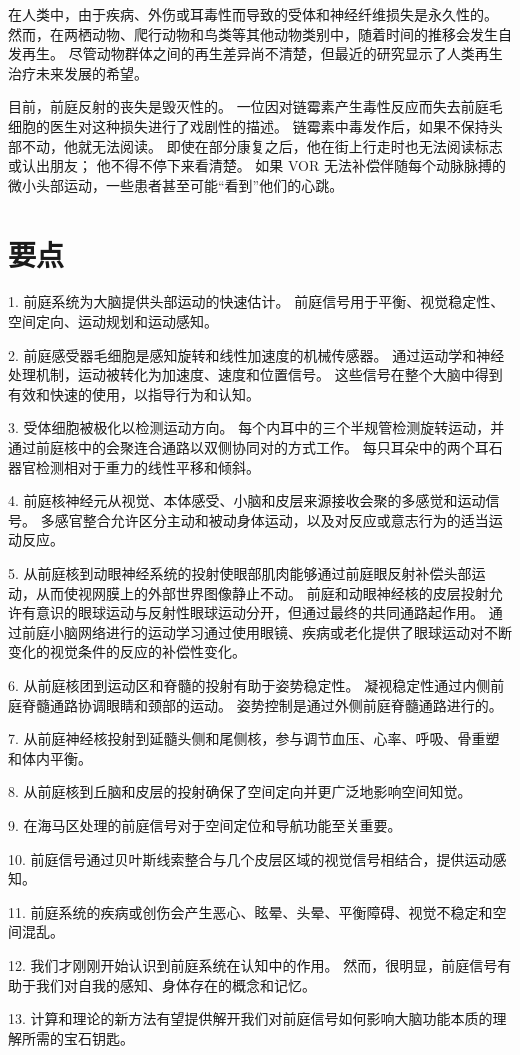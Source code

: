 在人类中，由于疾病、外伤或耳毒性而导致的受体和神经纤维损失是永久性的。
然而，在两栖动物、爬行动物和鸟类等其他动物类别中，随着时间的推移会发生自发再生。
尽管动物群体之间的再生差异尚不清楚，但最近的研究显示了人类再生治疗未来发展的希望。


目前，前庭反射的丧失是毁灭性的。
一位因对链霉素产生毒性反应而失去前庭毛细胞的医生对这种损失进行了戏剧性的描述。
链霉素中毒发作后，如果不保持头部不动，他就无法阅读。
即使在部分康复之后，他在街上行走时也无法阅读标志或认出朋友；
他不得不停下来看清楚。
如果 VOR 无法补偿伴随每个动脉脉搏的微小头部运动，一些患者甚至可能“看到”他们的心跳。



\section{要点}

1. 前庭系统为大脑提供头部运动的快速估计。
前庭信号用于平衡、视觉稳定性、空间定向、运动规划和运动感知。


2. 前庭感受器毛细胞是感知旋转和线性加速度的机械传感器。
通过运动学和神经处理机制，运动被转化为加速度、速度和位置信号。
这些信号在整个大脑中得到有效和快速的使用，以指导行为和认知。


3. 受体细胞被极化以检测运动方向。
每个内耳中的三个半规管检测旋转运动，并通过前庭核中的会聚连合通路以双侧协同对的方式工作。
每只耳朵中的两个耳石器官检测相对于重力的线性平移和倾斜。


4. 前庭核神经元从视觉、本体感受、小脑和皮层来源接收会聚的多感觉和运动信号。
多感官整合允许区分主动和被动身体运动，以及对反应或意志行为的适当运动反应。


5. 从前庭核到动眼神经系统的投射使眼部肌肉能够通过前庭眼反射补偿头部运动，从而使视网膜上的外部世界图像静止不动。
前庭和动眼神经核的皮层投射允许有意识的眼球运动与反射性眼球运动分开，但通过最终的共同通路起作用。
通过前庭小脑网络进行的运动学习通过使用眼镜、疾病或老化提供了眼球运动对不断变化的视觉条件的反应的补偿性变化。


6. 从前庭核团到运动区和脊髓的投射有助于姿势稳定性。
凝视稳定性通过内侧前庭脊髓通路协调眼睛和颈部的运动。
姿势控制是通过外侧前庭脊髓通路进行的。


7. 从前庭神经核投射到延髓头侧和尾侧核，参与调节血压、心率、呼吸、骨重塑和体内平衡。


8. 从前庭核到丘脑和皮层的投射确保了空间定向并更广泛地影响空间知觉。


9. 在海马区处理的前庭信号对于空间定位和导航功能至关重要。


10. 前庭信号通过贝叶斯线索整合与几个皮层区域的视觉信号相结合，提供运动感知。


11. 前庭系统的疾病或创伤会产生恶心、眩晕、头晕、平衡障碍、视觉不稳定和空间混乱。


12. 我们才刚刚开始认识到前庭系统在认知中的作用。 然而，很明显，前庭信号有助于我们对自我的感知、身体存在的概念和记忆。


13. 计算和理论的新方法有望提供解开我们对前庭信号如何影响大脑功能本质的理解所需的宝石钥匙。





